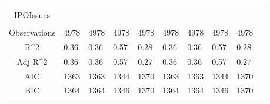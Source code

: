 \documentclass{article}
\begin{document}
\begin{table}[H]
\begin{tabular}{|clllllllll|}
   &  &  &  &  &  &  &  &  & \\ 
  IPOIssues &  &  &  &  &  &  &  &  & \\ 
   &  &  &  &  &  &  &  &  & \\ 
  \hline 
 Observations & 4978 & 4978 & 4978 & 4978 & 4978 & 4978 & 4978 & 4978 & \\ 
  R^2 & 0.36 & 0.36 & 0.57 & 0.28 & 0.36 & 0.36 & 0.57 & 0.28 & \\ 
  Adj R^2 & 0.36 & 0.36 & 0.57 & 0.27 & 0.36 & 0.36 & 0.57 & 0.27 & \\ 
  AIC & 1363 & 1363 & 1344 & 1370 & 1363 & 1363 & 1344 & 1370 & \\ 
  BIC & 1364 & 1364 & 1346 & 1370 & 1364 & 1364 & 1346 & 1370 & \\ 
   \hline
\end{tabular}
 
\end{table}
\end{document}

